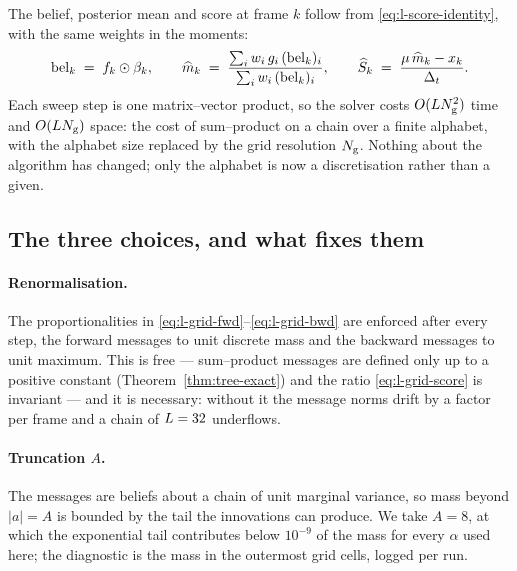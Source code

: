 The belief, posterior mean and score at frame $k$ follow from
\eqref{eq:l-score-identity}, with the same weights in the moments:
\begin{equation}
  \mathrm{bel}_k \;=\; f_k \odot \beta_k,
  \qquad
  \widehat m_k
    \;=\; \frac{\sum_i w_i\, g_i\, (\mathrm{bel}_k)_i}{\sum_i w_i\, (\mathrm{bel}_k)_i},
  \qquad
  \widehat {S}_k \;=\; \frac{\mu\, \widehat m_k - x_k}{\Delta_t}.
  \label{eq:l-grid-score}
\end{equation}
Each sweep step is one matrix--vector product, so the solver costs
$O(L N_{\mathrm{g}}^2)$ time and $O(L N_{\mathrm{g}})$ space: the cost of
sum--product on a chain over a finite alphabet, with the alphabet size
replaced by the grid resolution $N_{\mathrm{g}}$. Nothing about the algorithm has
changed; only the alphabet is now a discretisation rather than a given.

\subsection{The three choices, and what fixes them}

\paragraph{Renormalisation.} The proportionalities in
\eqref{eq:l-grid-fwd}--\eqref{eq:l-grid-bwd} are enforced after every step, the
forward messages to unit discrete mass and the backward messages to unit
maximum. This is free --- sum--product messages are defined only up to a
positive constant (Theorem~\ref{thm:tree-exact}) and the ratio
\eqref{eq:l-grid-score} is invariant --- and it is necessary: without it the
message norms drift by a factor per frame and a chain of $L = 32$
underflows.

\paragraph{Truncation $A$.} The messages are beliefs about a chain of unit
marginal variance, so mass beyond $|a| = A$ is bounded by the tail the
innovations can produce. We take $A = 8$, at which the exponential tail
contributes below $10^{-9}$ of the mass for every $\alpha$ used here; the
diagnostic is the mass in the outermost grid cells, logged per run.

